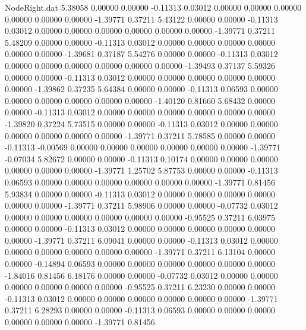 \begin{filecontents}{NodeRight.dat}
   5.38058    0.00000    0.00000    -0.11313    0.03012    0.00000    0.00000    0.00000    0.00000    0.00000    0.00000   -1.39771    0.37211
   5.43122    0.00000    0.00000    -0.11313    0.03012    0.00000    0.00000    0.00000    0.00000    0.00000    0.00000   -1.39771    0.37211
   5.48209    0.00000    0.00000    -0.11313    0.03012    0.00000    0.00000    0.00000    0.00000    0.00000    0.00000   -1.39681    0.37187
   5.54276    0.00000    0.00000    -0.11313    0.03012    0.00000    0.00000    0.00000    0.00000    0.00000    0.00000   -1.39493    0.37137
   5.59326    0.00000    0.00000    -0.11313    0.03012    0.00000    0.00000    0.00000    0.00000    0.00000    0.00000   -1.39862    0.37235
   5.64384    0.00000    0.00000    -0.11313    0.06593    0.00000    0.00000    0.00000    0.00000    0.00000    0.00000   -1.40120    0.81660
   5.68432    0.00000    0.00000    -0.11313    0.03012    0.00000    0.00000    0.00000    0.00000    0.00000    0.00000   -1.39820    0.37224
   5.73515    0.00000    0.00000    -0.11313    0.03012    0.00000    0.00000    0.00000    0.00000    0.00000    0.00000   -1.39771    0.37211
   5.78585    0.00000    0.00000    -0.11313   -0.00569    0.00000    0.00000    0.00000    0.00000    0.00000    0.00000   -1.39771   -0.07034
   5.82672    0.00000    0.00000    -0.11313    0.10174    0.00000    0.00000    0.00000    0.00000    0.00000    0.00000   -1.39771    1.25702
   5.87753    0.00000    0.00000    -0.11313    0.06593    0.00000    0.00000    0.00000    0.00000    0.00000    0.00000   -1.39771    0.81456
   5.93834    0.00000    0.00000    -0.11313    0.03012    0.00000    0.00000    0.00000    0.00000    0.00000    0.00000   -1.39771    0.37211
   5.98906    0.00000    0.00000    -0.07732    0.03012    0.00000    0.00000    0.00000    0.00000    0.00000    0.00000   -0.95525    0.37211
   6.03975    0.00000    0.00000    -0.11313    0.03012    0.00000    0.00000    0.00000    0.00000    0.00000    0.00000   -1.39771    0.37211
   6.09041    0.00000    0.00000    -0.11313    0.03012    0.00000    0.00000    0.00000    0.00000    0.00000    0.00000   -1.39771    0.37211
   6.13104    0.00000    0.00000    -0.14894    0.06593    0.00000    0.00000    0.00000    0.00000    0.00000    0.00000   -1.84016    0.81456
   6.18176    0.00000    0.00000    -0.07732    0.03012    0.00000    0.00000    0.00000    0.00000    0.00000    0.00000   -0.95525    0.37211
   6.23230    0.00000    0.00000    -0.11313    0.03012    0.00000    0.00000    0.00000    0.00000    0.00000    0.00000   -1.39771    0.37211
   6.28293    0.00000    0.00000    -0.11313    0.06593    0.00000    0.00000    0.00000    0.00000    0.00000    0.00000   -1.39771    0.81456

\end{filecontents}
